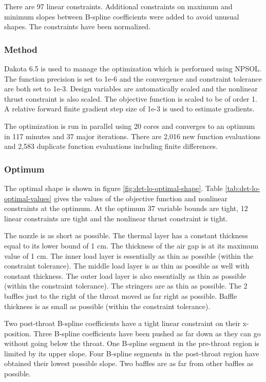 \documentclass{article}
\begin{document}
There are 97 linear constraints. Additional constraints on maximum and minimum slopes between B-spline coefficients were added to avoid unusual shapes. The constraints have been normalized.

\subsubsection{Method}

Dakota 6.5 is used to manage the optimization which is performed using NPSOL. The function precision is set to 1e-6 and the convergence and constraint tolerance are both set to 1e-3. Design variables are automatically scaled and the nonlinear thrust constraint is also scaled. The objective function is scaled to be of order 1. A relative forward finite gradient step size of 1e-3 is used to estimate gradients.

The optimization is run in parallel using 20 cores and converges to an optimum in 117 minutes and 37 major iterations. There are 2,016 new function evaluations and 2,583 duplicate function evaluations including finite differences.

\subsubsection{Optimum}

The optimal shape is shown in figure \ref{fig:det-lo-optimal-shape}. Table \ref{tab:det-lo-optimal-values} gives the values of the objective function and nonlinear constraints at the optimum. At the optimum 37 variable bounds are tight, 12 linear constraints are tight and the nonlinear thrust constraint is tight.

The nozzle is as short as possible. The thermal layer has a constant thickness equal to its lower bound of 1 cm. The thickness of the air gap is at its maximum value of 1 cm. The inner load layer is essentially as thin as possible (within the constraint tolerance). The middle load layer is as thin as possible as well with constant thickness. The outer load layer is also essentially as thin as possible (within the constraint tolerance). The stringers are as thin as possible. The 2 baffles just to the right of the throat moved as far right as possible. Baffle thickness is as small as possible (within the constraint tolerance).

Two post-throat B-spline coefficients have a tight linear constraint on their x-position. Three B-spline coefficients have been pushed as far down as they can go without going below the throat. One B-spline segment in the pre-throat region is limited by its upper slope. Four B-spline segments in the post-throat region have obtained their lowest possible slope. Two baffles are as far from other baffles as possible.
\end{document}
